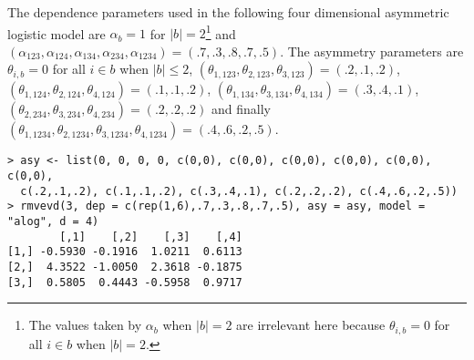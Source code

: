 \documentclass[11pt,a4paper]{article}
\begin{document}
The dependence parameters used in the following four dimensional asymmetric logistic model are $\alpha_b = 1$ for $|b| = 2$\footnote{
The values taken by $\alpha_b$ when $|b| = 2$ are irrelevant here because $\theta_{i,b}=0$ for all $i \in b$ when $|b|=2$.} 
and $(\alpha_{123},\alpha_{124},\alpha_{134},\alpha_{234},\alpha_{1234})=(.7,.3,.8,.7,.5)$.
The asymmetry parameters are $\theta_{i,b}=0$ for all $i \in b$ when $|b|\leq2$, $(\theta_{1,123},\theta_{2,123},\theta_{3,123})=(.2,.1,.2)$, $(\theta_{1,124},\theta_{2,124},\theta_{4,124})=(.1,.1,.2)$, $(\theta_{1,134},\theta_{3,134},\theta_{4,134})=(.3,.4,.1)$, $(\theta_{2,234},\theta_{3,234},\theta_{4,234})=(.2,.2,.2)$ and finally $(\theta_{1,1234},\theta_{2,1234},\theta_{3,1234},\theta_{4,1234})=(.4,.6,.2,.5)$.    

\begin{verbatim}
> asy <- list(0, 0, 0, 0, c(0,0), c(0,0), c(0,0), c(0,0), c(0,0), c(0,0), 
  c(.2,.1,.2), c(.1,.1,.2), c(.3,.4,.1), c(.2,.2,.2), c(.4,.6,.2,.5))
> rmvevd(3, dep = c(rep(1,6),.7,.3,.8,.7,.5), asy = asy, model = "alog", d = 4)
        [,1]    [,2]    [,3]    [,4]
[1,] -0.5930 -0.1916  1.0211  0.6113
[2,]  4.3522 -1.0050  2.3618 -0.1875
[3,]  0.5805  0.4443 -0.5958  0.9717
\end{verbatim}


%
%
%
%
%
%
%
%
\end{document}
